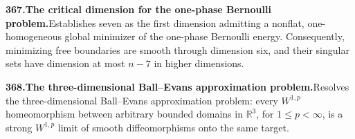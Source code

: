 \documentclass[11pt,a4paper]{article}
\begin{document}
  \par \begin{minipage}{\linewidth}
  \fontsize{10.5}{12.6}\selectfont\RaggedRight
  \hypertarget{result 367}{}
  {\bfseries\textcolor{muted}{367.}\enspace The critical dimension for the one-phase Bernoulli problem.}\enspace Establishes seven as the first dimension admitting a nonflat, one-homogeneous global minimizer of the one-phase Bernoulli energy. Consequently, minimizing free boundaries are smooth through dimension six, and their singular sets have dimension at most $n-7$ in higher dimensions.\par
  \end{minipage}\par\vspace{5pt}




  \par \begin{minipage}{\linewidth}
  \fontsize{10.5}{12.6}\selectfont\RaggedRight
  \hypertarget{result 368}{}
  {\bfseries\textcolor{muted}{368.}\enspace The three-dimensional Ball--Evans approximation problem.}\enspace Resolves the three-dimensional Ball--Evans approximation problem: every $W^{1,p}$ homeomorphism between arbitrary bounded domains in $\mathbb R^3$, for $1\le p<\infty$, is a strong $W^{1,p}$ limit of smooth diffeomorphisms onto the same target.\par
  \end{minipage}\par\vspace{5pt}
\end{document}
